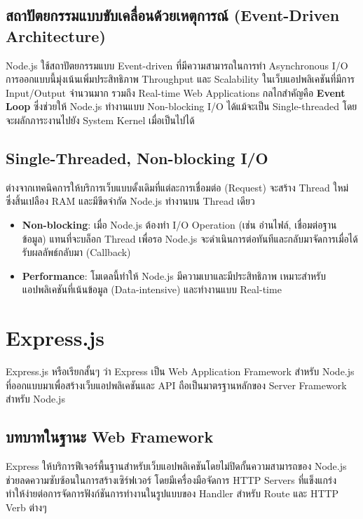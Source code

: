\subsection{สถาปัตยกรรมแบบขับเคลื่อนด้วยเหตุการณ์ (Event-Driven Architecture)}
Node.js ใช้สถาปัตยกรรมแบบ Event-driven ที่มีความสามารถในการทำ Asynchronous I/O การออกแบบนี้มุ่งเน้นเพิ่มประสิทธิภาพ Throughput และ Scalability ในเว็บแอปพลิเคชันที่มีการ Input/Output จำนวนมาก รวมถึง Real-time Web Applications กลไกสำคัญคือ \textbf{Event Loop} ซึ่งช่วยให้ Node.js ทำงานแบบ Non-blocking I/O ได้แม้จะเป็น Single-threaded โดยจะผลักภาระงานไปยัง System Kernel เมื่อเป็นไปได้

\subsection{Single-Threaded, Non-blocking I/O}
ต่างจากเทคนิคการให้บริการเว็บแบบดั้งเดิมที่แต่ละการเชื่อมต่อ (Request) จะสร้าง Thread ใหม่ ซึ่งสิ้นเปลือง RAM และมีขีดจำกัด Node.js ทำงานบน Thread เดียว
\begin{itemize}
    \item \textbf{Non-blocking}: เมื่อ Node.js ต้องทำ I/O Operation (เช่น อ่านไฟล์, เชื่อมต่อฐานข้อมูล) แทนที่จะบล็อก Thread เพื่อรอ Node.js จะดำเนินการต่อทันทีและกลับมาจัดการเมื่อได้รับผลลัพธ์กลับมา (Callback)
    \item \textbf{Performance}: โมเดลนี้ทำให้ Node.js มีความเบาและมีประสิทธิภาพ เหมาะสำหรับแอปพลิเคชันที่เน้นข้อมูล (Data-intensive) และทำงานแบบ Real-time
\end{itemize}

\section{Express.js}
Express.js หรือเรียกสั้นๆ ว่า Express เป็น Web Application Framework สำหรับ Node.js ที่ออกแบบมาเพื่อสร้างเว็บแอปพลิเคชันและ API ถือเป็นมาตรฐานหลักของ Server Framework สำหรับ Node.js

\subsection{บทบาทในฐานะ Web Framework}
Express ให้บริการฟีเจอร์พื้นฐานสำหรับเว็บแอปพลิเคชันโดยไม่ปิดกั้นความสามารถของ Node.js ช่วยลดความซับซ้อนในการสร้างเซิร์ฟเวอร์ โดยมีเครื่องมือจัดการ HTTP Servers ที่แข็งแกร่ง ทำให้ง่ายต่อการจัดการฟังก์ชันการทำงานในรูปแบบของ Handler สำหรับ Route และ HTTP Verb ต่างๆ

